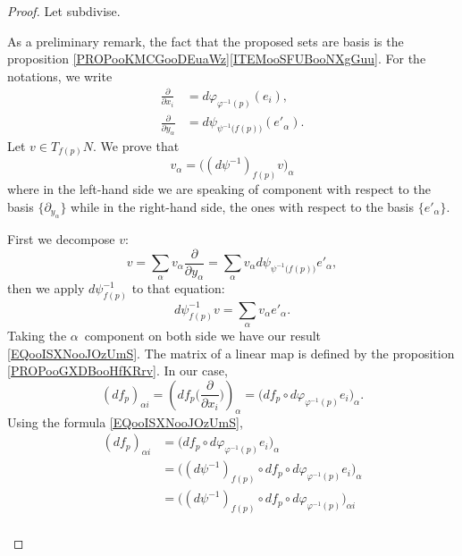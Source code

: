 \begin{proof}
	Let subdivise.
	\begin{subproof}
		\spitem[Notations]
		As a preliminary remark, the fact that the proposed sets are basis is the proposition \ref{PROPooKMCGooDEuaWz}\ref{ITEMooSFUBooNXgGuu}. For the notations, we write
		\begin{subequations}
			\begin{align}
				\frac{ \partial  }{ \partial x_i }        & =d\varphi_{\varphi^{-1}(p)}(e_i),                \\
				\frac{ \partial  }{ \partial y_{\alpha} } & =d\psi_{\psi^{-1}\big( f(p) \big)}(e'_{\alpha}).
			\end{align}
		\end{subequations}
		\spitem[Component]
		Let \( v\in T_{f(p)}N\). We prove that
		\begin{equation}        \label{EQooISXNooJOzUmS}
			v_{\alpha}=\Big( (d\psi^{-1})_{f(p)}v \Big)_{\alpha}
		\end{equation}
		where in the left-hand side we are speaking of component with respect to the basis \( \{ \partial_{y_{\alpha}} \}\) while in the right-hand side, the ones with respect to the basis \( \{ e'_{\alpha} \}\).

		First we decompose \( v\):
		\begin{equation}
			v=\sum_{\alpha}v_{\alpha}\frac{ \partial  }{ \partial y_{\alpha} }=\sum_{\alpha}v_{\alpha}d\psi_{\psi^{-1}\big( f(p) \big)}e'_{\alpha},
		\end{equation}
		then we apply \( d\psi^{-1}_{f(p)}\) to that equation:
		\begin{equation}
			d\psi^{-1}_{f(p)}v=\sum_{\alpha}v_{\alpha}e'_{\alpha}.
		\end{equation}
		Taking the \( \alpha\)\th\ component on both side we have our result \eqref{EQooISXNooJOzUmS}.
		\spitem[Matrix]
		The matrix of a linear map is defined by the proposition \ref{PROPooGXDBooHfKRrv}. In our case,
		\begin{equation}
			(df_p)_{\alpha i}=\left( df_p\big( \frac{ \partial  }{ \partial x_i } \big) \right)_{\alpha} =\Big( df_p\circ d\varphi_{\varphi^{-1}(p)}e_i \Big)_{\alpha}.
		\end{equation}
		Using the formula \eqref{EQooISXNooJOzUmS},
		\begin{subequations}
			\begin{align}
				(df_p)_{\alpha i} & =\Big( df_p\circ d\varphi_{\varphi^{-1}(p)}e_i \Big)_{\alpha}                          \\
				                  & =\big( (d\psi^{-1})_{f(p)}\circ df_p\circ d\varphi_{\varphi^{-1}(p)}e_i \big)_{\alpha} \\
				                  & =\big( (d\psi^{-1})_{f(p)}\circ df_p\circ d\varphi_{\varphi^{-1}(p)} \big)_{\alpha i}  \\
			\end{align}
		\end{subequations}
	\end{subproof}
\end{proof}

